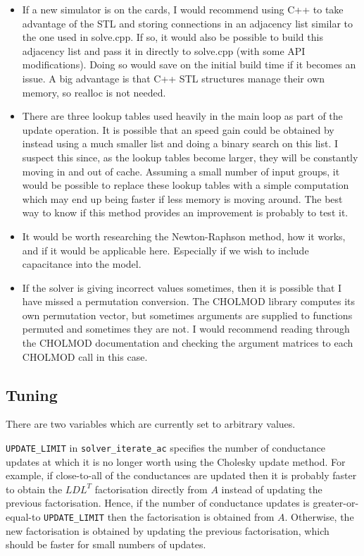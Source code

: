 \documentclass[11pt]{article}
\begin{document}
\begin{itemize}
    \item If a new simulator is on the cards, I would recommend using C++ to take advantage of the STL and storing connections in an adjacency list similar to the one used in solve.cpp. If so, it would also be possible to build this adjacency list and pass it in directly to solve.cpp (with some API modifications). Doing so would save on the initial build time if it becomes an issue. A big advantage is that C++ STL structures manage their own memory, so realloc is not needed.
    \item There are three lookup tables used heavily in the main loop as part of the update operation. It is possible that an speed gain could be obtained by instead using a much smaller list and doing a binary search on this list. I suspect this since, as the lookup tables become larger, they will be constantly moving in and out of cache. Assuming a small number of input groups, it would be possible to replace these lookup tables with a simple computation which may end up being faster if less memory is moving around. The best way to know if this method provides an improvement is probably to test it.
    \item It would be worth researching the Newton-Raphson method, how it works, and if it would be applicable here. Especially if we wish to include capacitance into the model.
    \item If the solver is giving incorrect values sometimes, then it is possible that I have missed a permutation conversion. The CHOLMOD library computes its own permutation vector, but sometimes arguments are supplied to functions permuted and sometimes they are not. I would recommend reading through the CHOLMOD documentation and checking the argument matrices to each CHOLMOD call in this case.
\end{itemize}

\subsection{Tuning}
There are two variables which are currently set to arbitrary values.

\texttt{UPDATE_LIMIT} in \texttt{solver_iterate_ac} specifies the number of conductance updates at which it is no longer worth using the Cholesky update method. For example, if close-to-all of the conductances are updated then it is probably faster to obtain the $LDL^T$ factorisation directly from $A$ instead of updating the previous factorisation. Hence, if the number of conductance updates is greater-or-equal-to \texttt{UPDATE_LIMIT} then the factorisation is obtained from $A$. Otherwise, the new factorisation is obtained by updating the previous factorisation, which should be faster for small numbers of updates.
\end{document}
